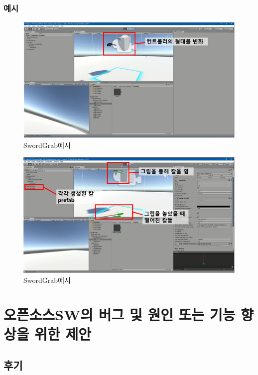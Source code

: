\documentclass{report}
\begin{document}
    \subsection{예시}
    
    \begin{figure}[h!]
    \centering
    \includegraphics[width=1.0\textwidth]{vrtk5-1.jpg}
    \caption{SwordGrab예시}
    \end{figure}
    
    \begin{figure}[h!]
    \centering
    \includegraphics[width=1.0\textwidth]{vrtk5-2.jpg}
    \caption{SwordGrab예시}
    \end{figure}
    
 
    \chapter {오픈소스SW의 버그 및 원인 또는 기능 향상을 위한 제안}
    \section {후기}
    
\end{document}
